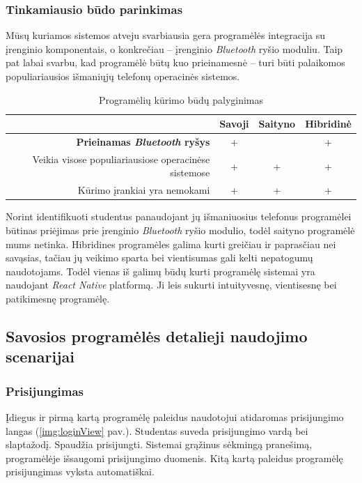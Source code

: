 \documentclass{VUMIFPSkursinis}
\begin{document}
\subsubsection{Tinkamiausio būdo parinkimas}

Mūsų kuriamos sistemos atveju svarbiausia gera programėlės integracija su įrenginio komponentais, o konkrečiau – įrenginio \textit{Bluetooth} ryšio moduliu. Taip pat labai svarbu, kad programėlė būtų kuo prieinamesnė – turi būti palaikomos populiariausios išmaniųjų telefonų operacinės sistemos.

\begin{table}[H]
	\centering
	\begin{tabular}{ | r | c | c | c | }
		\hline
		& Savoji & Saityno & Hibridinė \\
		\hline
		\textbf{Prieinamas \textit{Bluetooth} ryšys} & + &  & + \\
		\hline
		Veikia visose populiariausiose operacinėse sistemose & + & + & + \\
		\hline
		Kūrimo įrankiai yra nemokami & + & + & + \\
		\hline
	\end{tabular}
	\caption{Programėlių kūrimo būdų palyginimas}
	\label{appCompare}
\end{table}

Norint identifikuoti studentus panaudojant jų išmaniuosius telefonus programėlei būtinas priėjimas prie įrenginio \textit{Bluetooth} ryšio modulio, todėl saityno programėlė mums netinka. Hibridines programėles galima kurti greičiau ir paprasčiau nei savąsias, tačiau jų veikimo sparta bei vientisumas gali kelti nepatogumų naudotojams. Todėl vienas iš galimų būdų kurti programėlę sistemai yra naudojant \textit{React Native} platformą. Ji leis sukurti intuityvesnę, vientisesnę bei patikimesnę programėlę.

\subsection{Savosios programėlės detalieji naudojimo scenarijai}

\subsubsection{Prisijungimas}

Įdiegus ir pirmą kartą programėlę paleidus naudotojui atidaromas prisijungimo langas (\ref{img:loginView} pav.). Studentas suveda prisijungimo vardą bei slaptažodį. Spaudžia prisijungti. Sistemai grąžinus sėkmingą pranešimą, programėlėje išsaugomi prisijungimo duomenis. Kitą kartą paleidus programėlę prisijungimas vyksta automatiškai.
\end{document}
